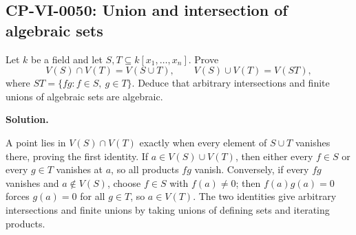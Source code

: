 
\subsection*{CP-VI-0050: Union and intersection of algebraic sets}

Let $k$ be a field and let $S,T\subseteq k[x_1,\dots,x_n]$. Prove
\[
V(S)\cap V(T)=V(S\cup T),\qquad
V(S)\cup V(T)=V(ST),
\]
where $ST=\{fg:f\in S,\ g\in T\}$. Deduce that arbitrary intersections and finite unions of algebraic sets are algebraic.

\medskip
\noindent\textbf{Solution.}

A point lies in $V(S)\cap V(T)$ exactly when every element of $S\cup T$ vanishes there, proving the first identity. If $a\in V(S)\cup V(T)$, then either every $f\in S$ or every $g\in T$ vanishes at $a$, so all products $fg$ vanish. Conversely, if every $fg$ vanishes and $a\notin V(S)$, choose $f\in S$ with $f(a)\ne0$; then $f(a)g(a)=0$ forces $g(a)=0$ for all $g\in T$, so $a\in V(T)$. The two identities give arbitrary intersections and finite unions by taking unions of defining sets and iterating products.
